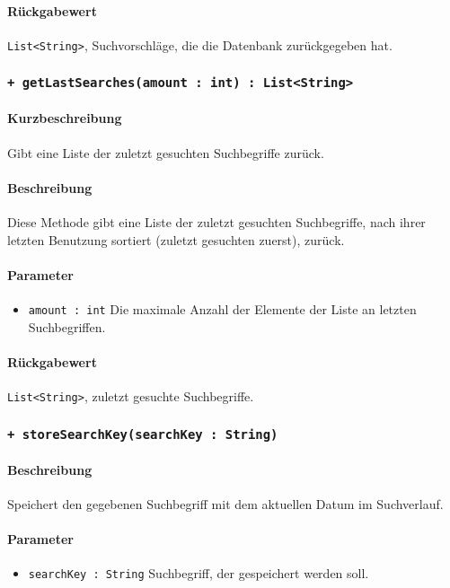 \paragraph*{Rückgabewert}
\texttt{List<String>}, Suchvorschläge, die die Datenbank zurückgegeben hat.

 \subsubsection*{\texttt{+ getLastSearches(amount : int) : List<String>}}%
\paragraph*{Kurzbeschreibung}
Gibt eine Liste der zuletzt gesuchten Suchbegriffe zurück.
\paragraph*{Beschreibung}
Diese Methode gibt eine Liste der zuletzt gesuchten Suchbegriffe, nach ihrer letzten Benutzung sortiert (zuletzt gesuchten zuerst), zurück.
\paragraph*{Parameter}
\begin{itemize}
    \item \texttt{amount : int} Die maximale Anzahl der Elemente der Liste an letzten Suchbegriffen.
\end{itemize}
\paragraph*{Rückgabewert}
\texttt{List<String>}, zuletzt gesuchte Suchbegriffe.

 \subsubsection*{\texttt{+ storeSearchKey(searchKey : String)}}%
\paragraph*{Beschreibung}
Speichert den gegebenen Suchbegriff mit dem aktuellen Datum im Suchverlauf.
\paragraph*{Parameter}
\begin{itemize}
    \item \texttt{searchKey : String} Suchbegriff, der gespeichert werden soll.
\end{itemize}
